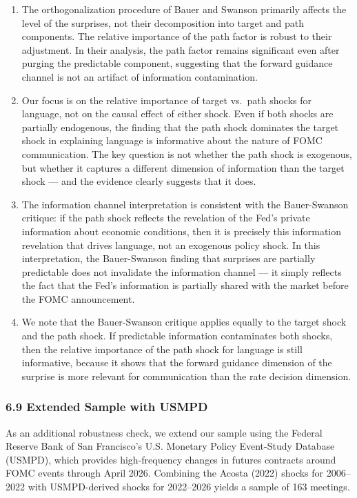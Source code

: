 \documentclass[12pt]{article}
\begin{document}
\begin{enumerate}
\def\labelenumi{\arabic{enumi}.}
\item
  The orthogonalization procedure of Bauer and Swanson primarily affects
  the level of the surprises, not their decomposition into target and
  path components. The relative importance of the path factor is robust
  to their adjustment. In their analysis, the path factor remains
  significant even after purging the predictable component, suggesting
  that the forward guidance channel is not an artifact of information
  contamination.
\item
  Our focus is on the relative importance of target vs.~path shocks for
  language, not on the causal effect of either shock. Even if both
  shocks are partially endogenous, the finding that the path shock
  dominates the target shock in explaining language is informative about
  the nature of FOMC communication. The key question is not whether the
  path shock is exogenous, but whether it captures a different dimension
  of information than the target shock --- and the evidence clearly
  suggests that it does.
\item
  The information channel interpretation is consistent with the
  Bauer-Swanson critique: if the path shock reflects the revelation of
  the Fed's private information about economic conditions, then it is
  precisely this information revelation that drives language, not an
  exogenous policy shock. In this interpretation, the Bauer-Swanson
  finding that surprises are partially predictable does not invalidate
  the information channel --- it simply reflects the fact that the Fed's
  information is partially shared with the market before the FOMC
  announcement.
\item
  We note that the Bauer-Swanson critique applies equally to the target
  shock and the path shock. If predictable information contaminates both
  shocks, then the relative importance of the path shock for language is
  still informative, because it shows that the forward guidance
  dimension of the surprise is more relevant for communication than the
  rate decision dimension.
\end{enumerate}

\subsubsection{6.9 Extended Sample with
USMPD}\label{extended-sample-with-usmpd}

As an additional robustness check, we extend our sample using the
Federal Reserve Bank of San Francisco's U.S. Monetary Policy Event-Study
Database (USMPD), which provides high-frequency changes in futures
contracts around FOMC events through April 2026. Combining the Acosta
(2022) shocks for 2006--2022 with USMPD-derived shocks for 2022--2026
yields a sample of 163 meetings.
\end{document}
